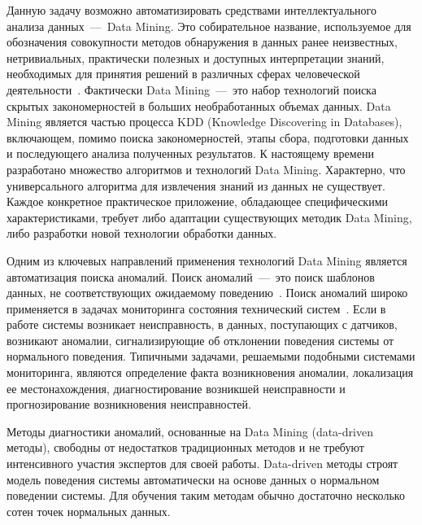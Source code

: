 Данную задачу возможно автоматизировать средствами интеллектуального анализа данных~--–~Data Mining. Это собирательное название, используемое для обозначения совокупности методов обнаружения в данных ранее неизвестных, нетривиальных, практически полезных и доступных интерпретации знаний, необходимых для принятия решений в различных сферах человеческой деятельности~\cite{ShapiroDataMining}. Фактически Data Mining~---~это набор технологий поиска скрытых закономерностей в больших необработанных объемах данных. Data Mining является частью процесса KDD (Knowledge Discovering in Databases), включающем, помимо поиска закономерностей, этапы сбора, подготовки данных и последующего анализа полученных результатов. К настоящему времени разработано множество алгоритмов и технологий Data Mining. Характерно, что универсального алгоритма для извлечения знаний из данных не существует. Каждое конкретное практическое приложение, обладающее специфическими характеристиками, требует либо адаптации существующих методик Data Mining, либо разработки новой технологии обработки данных.

Одним из ключевых направлений применения технологий Data Mining является автоматизация поиска аномалий. Поиск аномалий~---~это поиск шаблонов данных, не соответствующих ожидаемому поведению~\cite{AnomalyDetectionASurvey}. Поиск аномалий широко применяется в задачах мониторинга состояния технический систем~\cite{DerevyanenkoDataMining}. Если в работе системы возникает неисправность, в данных, поступающих с датчиков, возникают аномалии, сигнализирующие об отклонении поведения системы от нормального поведения. Типичными задачами, решаемыми подобными системами мониторинга, являются определение факта возникновения аномалии, локализация ее местонахождения, диагностирование возникшей неисправности и прогнозирование возникновения неисправностей.

Методы диагностики аномалий, основанные на Data Mining (data-­driven методы), свободны от недостатков традиционных методов и не требуют интенсивного участия экспертов для своей работы. Data-­driven методы строят модель поведения системы автоматически на основе данных о нормальном поведении системы. Для обучения таким методам обычно достаточно несколько сотен точек нормальных данных.

